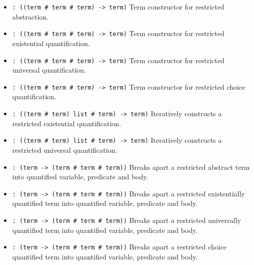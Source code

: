 \documentclass[12pt]{article}
\begin{document}
\begin{itemize}
\item {} \verb|: ((term # term # term) -> term)|\newline
Term constructor for restricted abstraction.

\item {} \verb|: ((term # term # term) -> term)|\newline
Term constructor for restricted existential quantification.

\item {} \verb|: ((term # term # term) -> term)|\newline
Term constructor for restricted universal quantification.

\item {} \verb|: ((term # term # term) -> term)|\newline
Term constructor for restricted choice quantification.

\item {} \verb|: ((term # term) list # term) -> term)|\newline
Iteratively constructs a restricted existential quantification.

\item {} \verb|: ((term # term) list # term) -> term)|\newline
Iteratively constructs a restricted universal quantification.

\item {} \verb|: (term -> (term # term # term))|\newline
Breaks apart a restricted abstract term into
quantified variable, predicate and body.

\item {} \verb|: (term -> (term # term # term))|\newline
Breaks apart a restricted existentially quantified term into
quantified variable, predicate and body.

\item {} \verb|: (term -> (term # term # term))|\newline
Breaks apart a restricted universally quantified term into
quantified variable, predicate and body.

\item {} \verb|: (term -> (term # term # term))|\newline
Breaks apart a restricted choice quantified term into
quantified variable, predicate and body.


\end{itemize}
\end{document}

